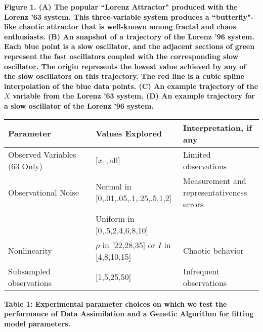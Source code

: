 \documentclass[onecolumn]{article}
\begin{document}
{\bf\small Figure 1. (A) The popular ``Lorenz Attractor" produced with the Lorenz '63 system. This three-variable system produces a ``butterfly"-like chaotic attractor that is well-known among fractal and chaos enthusiasts. (B) An snapshot of a trajectory of the Lorenz '96 system. Each blue point is a slow oscillator, and the adjacent sections of green represent the fast oscillators coupled with the corresponding slow oscillator. The origin represents the lowest value achieved by any of the slow oscillators on this trajectory. The red line is a cubic spline interpolation of the blue data points. (C) An example trajectory of the $X$ variable from the Lorenz '63 system. (D) An example trajectory for a slow oscillator of the Lorenz '96 system.}\\
\begin{multicols}{2}

\end{multicols}
\begin{center}
\begin{tabular}{lll}
  \hline
  Parameter & Values Explored & Interpretation, if any\\
  \hline
  \hline
  Observed Variables (63 Only) & $[x_1,$all] & Limited observations\\
  \hline
  Observational Noise & Normal in [0,.01,.05,.1,.25,.5,1,2] & Measurement and representativeness errors\\
  ~~~~~~~~~~~~~~~~~~~ & Uniform in [0,.5,2,4,6,8,10] & \\
  \hline
  Nonlinearity & $\rho$ in [22,28,35] or $I$ in [4,8,10,15] & Chaotic behavior\\
  \hline
  Subsampled observations & [1,5,25,50] & Infrequent observations\\
  \hline
\end{tabular}
\vspace{3mm}

{\bf\small Table 1: Experimental parameter choices on which we test the performance of Data Assimilation and a Genetic Algorithm for fitting model parameters.}
\end{center}
\end{document}
